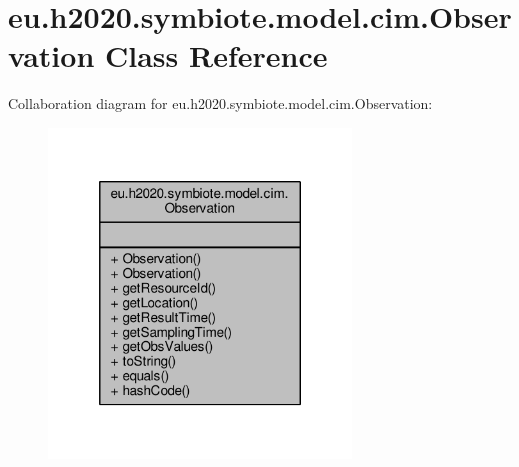 \hypertarget{classeu_1_1h2020_1_1symbiote_1_1model_1_1cim_1_1Observation}{}\section{eu.\+h2020.\+symbiote.\+model.\+cim.\+Observation Class Reference}
\label{classeu_1_1h2020_1_1symbiote_1_1model_1_1cim_1_1Observation}


Collaboration diagram for eu.\+h2020.\+symbiote.\+model.\+cim.\+Observation\+:
\nopagebreak
\begin{figure}[H]
\begin{center}
\leavevmode
\includegraphics[width=228pt]{classeu_1_1h2020_1_1symbiote_1_1model_1_1cim_1_1Observation__coll__graph}
\end{center}
\end{figure}
